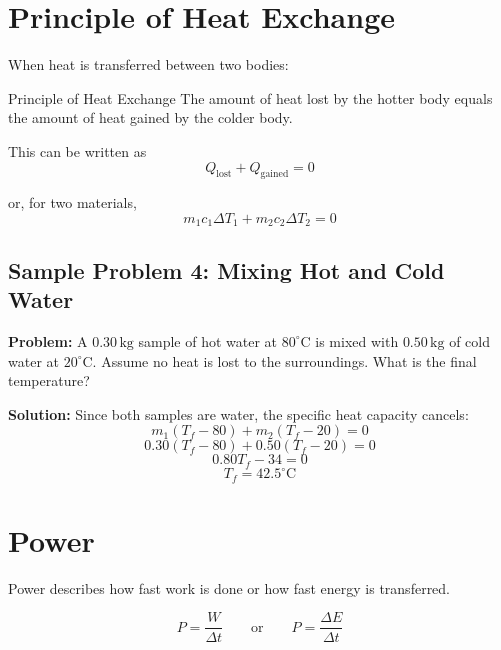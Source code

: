 \section{Principle of Heat Exchange}
When heat is transferred between two bodies:

\begin{keyidea}{Principle of Heat Exchange}
The amount of heat lost by the hotter body equals the amount of heat gained by the colder body.
\end{keyidea}

This can be written as
\begin{equation}
    Q_{\text{lost}} + Q_{\text{gained}} = 0
\end{equation}

or, for two materials,
\begin{equation}
    m_1c_1\Delta T_1 + m_2c_2\Delta T_2 = 0
\end{equation}

\subsection*{Sample Problem 4: Mixing Hot and Cold Water}
\textbf{Problem:} A $0.30\,\text{kg}$ sample of hot water at $80^\circ \text{C}$ is mixed with $0.50\,\text{kg}$ of cold water at $20^\circ \text{C}$. Assume no heat is lost to the surroundings. What is the final temperature?

\textbf{Solution:}
Since both samples are water, the specific heat capacity cancels:
\begin{equation*}
    m_1(T_f - 80) + m_2(T_f - 20) = 0
\end{equation*}
\begin{equation*}
    0.30(T_f - 80) + 0.50(T_f - 20) = 0
\end{equation*}
\begin{equation*}
    0.80T_f - 34 = 0
\end{equation*}
\begin{equation*}
    T_f = 42.5^\circ \text{C}
\end{equation*}

\section{Power}
Power describes how fast work is done or how fast energy is transferred.

\begin{equation}
    P = \frac{W}{\Delta t}
    \qquad \text{or} \qquad
    P = \frac{\Delta E}{\Delta t}
\end{equation}

